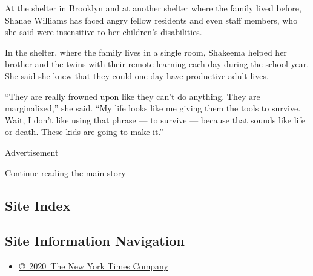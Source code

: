 At the shelter in Brooklyn and at another shelter where the family lived
before, Shanae Williams has faced angry fellow residents and even staff
members, who she said were insensitive to her children's disabilities.

In the shelter, where the family lives in a single room, Shakeema helped
her brother and the twins with their remote learning each day during the
school year. She said she knew that they could one day have productive
adult lives.

``They are really frowned upon like they can't do anything. They are
marginalized,'' she said. ``My life looks like me giving them the tools
to survive. Wait, I don't like using that phrase --- to survive ---
because that sounds like life or death. These kids are going to make
it.''

Advertisement

\protect\hyperlink{after-bottom}{Continue reading the main story}

\hypertarget{site-index}{%
\subsection{Site Index}\label{site-index}}

\hypertarget{site-information-navigation}{%
\subsection{Site Information
Navigation}\label{site-information-navigation}}

\begin{itemize}
\tightlist
\item
  \href{https://help.nytimes3xbfgragh.onion/hc/en-us/articles/115014792127-Copyright-notice}{©~2020~The
  New York Times Company}
\end{itemize}

